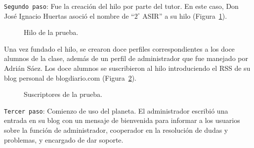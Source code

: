 \documentclass[a4paper, 12pt]{book}
\begin{document}
\texttt{Segundo paso}: Fue la creaci\'on del hilo por parte del tutor. En este caso, Don Jos\'e Ignacio Huertas asoci\'o el nombre de ``$2^\circ$ ASIR'' a su hilo 
(Figura~\ref{figura:pasohilo}).\\
\begin{figure}[htbp] 
  \centering
  \caption{Hilo de la prueba.}
  \label{figura:pasohilo}
\end{figure}
Una vez fundado el hilo, se crearon doce perfiles correspondientes a los doce alumnos de la clase, adem\'as de un perfil de administrador que fue manejado 
por Adri\'an S\'aez. Los doce alumnos se suscribieron al hilo introduciendo el RSS de su blog personal de blogdiario.com 
(Figura~\ref{figura:suscriptoreshilo}).
\begin{figure}[htbp] 
  \centering
  \caption{Suscriptores de la prueba.}
  \label{figura:suscriptoreshilo}
\end{figure}

\texttt{Tercer paso}: Comienzo de uso del planeta. El administrador escribi\'o una entrada en su blog con un mensaje de bienvenida para informar a los usuarios sobre la 
funci\'on de administrador, cooperador en la resoluci\'on de dudas y problemas, y encargado de dar soporte.
\end{document}
